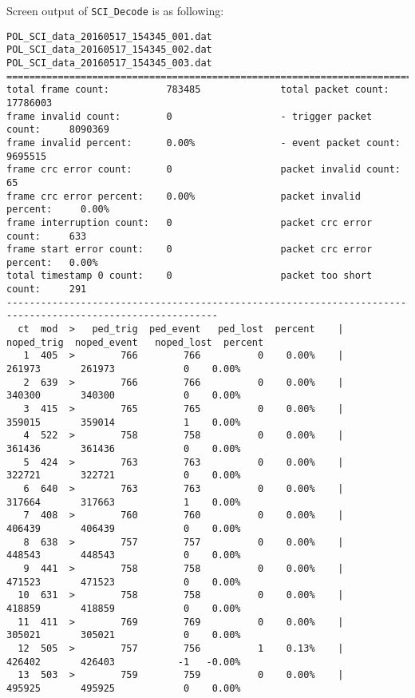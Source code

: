 \documentclass[a4paper, 12pt, onecolumn]{article}
\begin{document}
Screen output of \texttt{SCI\_Decode} is as following:
\begin{Verbatim}[fontsize=\tiny, frame=single]
POL_SCI_data_20160517_154345_001.dat
POL_SCI_data_20160517_154345_002.dat
POL_SCI_data_20160517_154345_003.dat
===========================================================================================================
total frame count:          783485              total packet count:         17786003  
frame invalid count:        0                   - trigger packet count:     8090369   
frame invalid percent:      0.00%               - event packet count:       9695515   
frame crc error count:      0                   packet invalid count:       65        
frame crc error percent:    0.00%               packet invalid percent:     0.00%     
frame interruption count:   0                   packet crc error count:     633       
frame start error count:    0                   packet crc error percent:   0.00%     
total timestamp 0 count:    0                   packet too short count:     291                 
-----------------------------------------------------------------------------------------------------------
  ct  mod  >   ped_trig  ped_event   ped_lost  percent    |   noped_trig  noped_event   noped_lost  percent
   1  405  >        766        766          0    0.00%    |       261973       261973            0    0.00%
   2  639  >        766        766          0    0.00%    |       340300       340300            0    0.00%
   3  415  >        765        765          0    0.00%    |       359015       359014            1    0.00%
   4  522  >        758        758          0    0.00%    |       361436       361436            0    0.00%
   5  424  >        763        763          0    0.00%    |       322721       322721            0    0.00%
   6  640  >        763        763          0    0.00%    |       317664       317663            1    0.00%
   7  408  >        760        760          0    0.00%    |       406439       406439            0    0.00%
   8  638  >        757        757          0    0.00%    |       448543       448543            0    0.00%
   9  441  >        758        758          0    0.00%    |       471523       471523            0    0.00%
  10  631  >        758        758          0    0.00%    |       418859       418859            0    0.00%
  11  411  >        769        769          0    0.00%    |       305021       305021            0    0.00%
  12  505  >        757        756          1    0.13%    |       426402       426403           -1   -0.00%
  13  503  >        759        759          0    0.00%    |       495925       495925            0    0.00%

\end{Verbatim}
\end{document}
